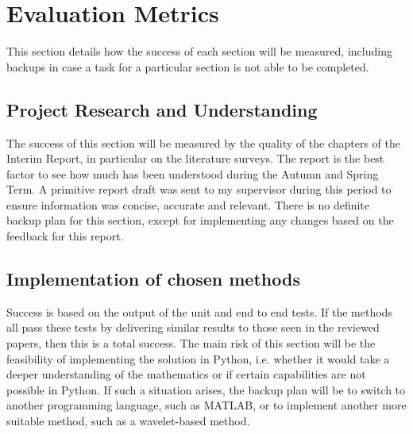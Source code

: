 \documentclass[11pt, a4paper]{article}
\begin{document}
\section{Evaluation Metrics}
This section details how the success of each section will be measured, including backups in case a task for a particular section is not able to be completed.

\subsection{Project Research and Understanding}
The success of this section will be measured by the quality of the chapters of the Interim Report, in particular on the literature surveys. The report is the best factor to see how much has been understood during the Autumn and Spring Term. A primitive report draft was sent to my supervisor during this period to ensure information was concise, accurate and relevant. There is no definite backup plan for this section, except for implementing any changes based on the feedback for this report.

\subsection{Implementation of chosen methods}
Success is based on the output of the unit and end to end tests. If the methods all pass these tests by delivering similar results to those seen in the reviewed papers, then this is a total success. The main risk of this section will be the feasibility of implementing the solution in Python, i.e. whether it would take a deeper understanding of the mathematics or if certain capabilities are not possible in Python. If such a situation arises, the backup plan will be to switch to another programming language, such as MATLAB, or to implement another more suitable method, such as a wavelet-based method.
\end{document}

